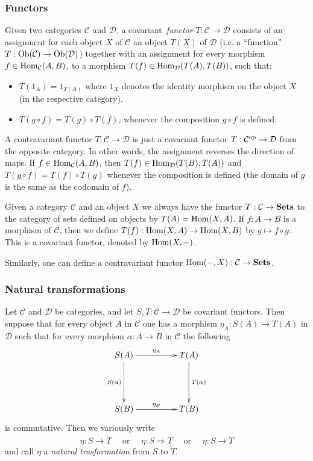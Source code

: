 \documentclass[10pt]{article}
\theoremstyle{plain}
\theoremstyle{definition}
\theoremstyle{remark}
\begin{document}
\subsubsection{Functors}
Given two categories $\mathcal{C}$ and $\mathcal{D}$, a covariant\ {\em functor} $T:\mathcal{C}\to\mathcal{D}$ consists of an assignment for each object $X$ of $\mathcal{C}$ an object $T(X)$ of $\mathcal{D}$ (i.e. a ``function'' $T:{\rm Ob}(\mathcal{C})\to{\rm Ob}(\mathcal{D})$) together with an assignment for every morphism $f\in{\rm Hom}_{\mathcal{C}}(A,B)$, to a morphism $T(f)\in{\rm Hom}_{\mathcal{D}}(T(A),T(B))$, such that:
\begin{itemize}
\item $T(1_A) = 1_{T(A)}$ where $1_X$ denotes the identity morphism on the object $X$ (in the respective category).
\item $T(g \circ f) = T(g)\circ T(f)$, whenever the composition $g\circ f$ is defined.
\end{itemize}

A contravariant functor $T :\mathcal{C}\to\mathcal{D}$ is just a covariant functor $T:\mathcal{C}^{\rm op}\to\mathcal{D}$ from the opposite category.  In other words, the assignment reverses the direction of maps.  If $f\in{\rm Hom}_{\mathcal{C}}(A,B)$, then $T(f)\in{\rm Hom}_{\mathcal{D}}(T(B),T(A))$ and $T(g\circ f) = T(f)\circ T(g)$ whenever the composition is defined (the domain of $g$ is the same as the codomain of $f$).

Given a category $\mathcal{C}$ and an object $X$ we always have the functor $T : \mathcal{C}\to{\bf Sets}$ to the category of sets defined on objects by $T(A) = {\rm Hom}(X, A)$.  If $f : A \to B$ is a morphism of $\mathcal{C}$, then we define $T(f) : {\rm Hom}(X,A)\to {\rm Hom}(X,B)$ by $g\mapsto f\circ g$.  This is a covariant functor, denoted by ${\rm Hom}(X,-)$.

Similarly, one can define a contravariant functor ${\rm Hom}(-,X) :\mathcal{C}\to{\bf Sets}$.

\subsubsection{Natural transformations}
Let $\mathcal{C}$ and $\mathcal{D}$ be categories, and let
$S,T:\mathcal{C}\to\mathcal{D}$ be covariant functors. Then suppose
that for every object $A$ in $\mathcal{C}$ one has a morphism
$\eta_A :  S(A) \to T(A) $ in $\mathcal{D}$ such that for every morphism
$\alpha: A \to B$ in $\mathcal{C}$ the following
$$
\xymatrix@+=4pc{S(A) \ar[d]_{S(\alpha)} \ar[r]^{\eta_A} & T(A) \ar[d]^{T(\alpha)} \\
S(B) \ar[r]^{\eta_{B}} & T(B)
}
$$
is commutative.  Then we variously write
$$
\eta: S \dot{\to} T \quad\mbox{ or }\quad \eta: S\Rightarrow T\quad \mbox{ or } \quad \eta:S\to T
$$
and call $\eta$ a \emph{natural trasformation} from $S$ to $T$.
\end{document}
